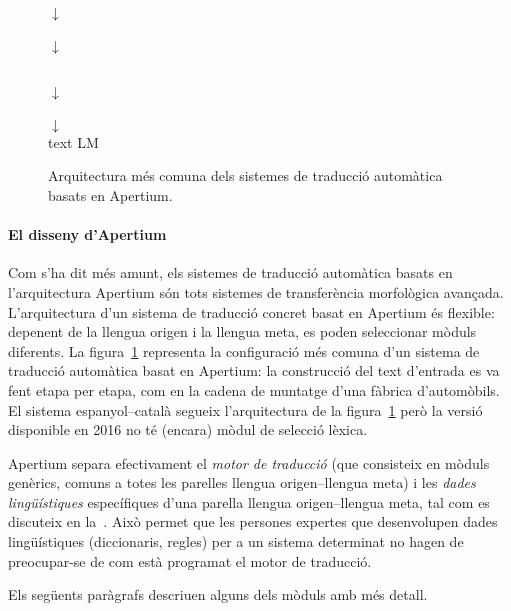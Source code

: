 \begin{figure}
{\begin{center}
{{\begin{center}
\(\downarrow\)\\
 \\
\(\downarrow\)\\
\vspace{-3ex}
\end{center}
}}
\\
\(\downarrow\)\\
 \\
\(\downarrow\)\\
text LM \\
\end{center}
}
\caption{Arquitectura més comuna dels sistemes de traducció automàtica basats en Apertium.}
\label{fg:modules}
\end{figure}

\paragraph{El disseny d'Apertium}
Com s'ha dit més amunt, els sistemes de traducció automàtica basats en
l'arquitectura Apertium són tots sistemes de transferència morfològica
avançada. L'arquitectura d'un sistema de traducció concret basat en
Apertium és flexible: depenent de la llengua origen i la llengua meta,
es poden seleccionar mòduls diferents. La figura~\ref{fg:modules}
representa la configuració més comuna d'un sistema de traducció
automàtica basat en Apertium: la construcció del text d'entrada es va
fent etapa per etapa, com en la cadena de muntatge d'una fàbrica
d'automòbils. El sistema espanyol--català segueix l'arquitectura de la
figura~\ref{fg:modules} però la versió disponible en 2016 no té
(encara) mòdul de selecció lèxica.

Apertium separa efectivament el \emph{motor de traducció} (que
consisteix en mòduls genèrics, comuns a totes les parelles llengua
origen--llengua meta) i les \emph{dades lingüístiques} específiques
d'una parella llengua origen--llengua meta, tal com es discuteix en
la~\pageref{pg:separacio}. Això permet que les persones expertes que
desenvolupen dades lingüístiques (diccionaris, regles) per a un
sistema determinat no hagen de preocupar-se de com està programat el
motor de traducció.

Els següents paràgrafs descriuen alguns dels mòduls amb més detall.


